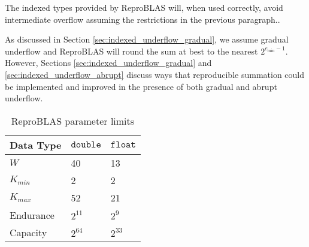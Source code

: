     The indexed types provided by ReproBLAS will, when used correctly, avoid intermediate overflow assuming the restrictions in the previous paragraph..

    As discussed in Section \ref{sec:indexed_underflow_gradual}, we assume gradual underflow and ReproBLAS will round the sum at best to the nearest $2^{e_{\min} - 1}$. However, Sections \ref{sec:indexed_underflow_gradual} and \ref{sec:indexed_underflow_abrupt} discuss ways that reproducible summation could be implemented and improved in the presence of both gradual and abrupt underflow.

    \begin{table}[!htbp]
        \centering
        \caption{ReproBLAS parameter limits}
        \begin{tabular}{| l | l | l |}\hline
            Data Type & $\texttt{double}$ & $\texttt{float}$ \\ \hline
            $W$ & 40 & 13 \\ \hline
            $K_{min}$ & 2 & 2 \\ \hline
            $K_{max}$ & 52 & 21 \\ \hline
            Endurance & $2^{11}$ & $2^9$ \\ \hline
            Capacity & $2^{64}$ & $2^{33}$ \\ \hline
        \end{tabular}
    \end{table}
